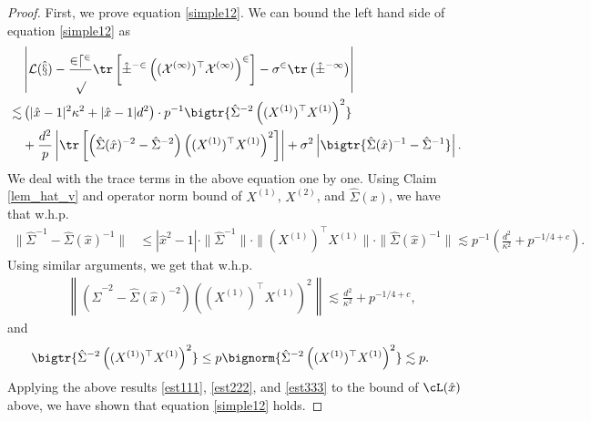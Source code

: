 \documentclass[aos,preprint]{imsart}
\begin{document}
\begin{proof}
First, we prove equation \eqref{simple12}.
We can bound the left hand side of equation \eqref{simple12} as
\begin{align*}
	&\left|\cal L(\hat x)-\frac{2d^2}{p}\tr\left[\hat\Sigma^{-2} \left((X^{(1)})^\top X^{(1)} \right)^2\right] -\sigma^2  \tr\left({\hat\Sigma^{-1}  }\right)\right| \\
	\lesssim &\left(|\hat x-1|^2 \kappa^2 + |\hat x-1|d^2\right)\cdot p^{-1}\bigtr{ \hat\Sigma^{-2} \left((X^{(1)})^{\top}X^{(1)}\right)^2 } \\
	&+ \frac{d^2}{p}\left|\tr\left[\left(\hat\Sigma(\hat x)^{-2}-\hat\Sigma^{-2}\right) \left((X^{(1)})^\top X^{(1)} \right)^2\right]\right|+ \sigma^2  \left|\bigtr{\hat\Sigma(\hat x)^{-1}-\hat\Sigma^{-1}  }\right|.
\end{align*}
We deal with the trace terms in the above equation one by one.
Using Claim \ref{lem_hat_v} and operator norm bound of $X^{(1)}$, $X^{(2)}$, and $\hat{\Sigma}(x)$, we have that w.h.p.
\begin{align}
	\|\hat\Sigma^{-1}-\hat\Sigma(\hat x)^{-1}\| &\le |\hat x^2-1| \cdot \|\hat\Sigma^{-1}\| \cdot \| (X^{(1)})^\top X^{(1)}\| \cdot \|\hat\Sigma(\hat x)^{-1}\|  \lesssim p^{-1}\left(\frac{d^2}{\kappa^2} + p^{-1/4+c}\right).\label{est111}
\end{align}
Using similar arguments, we get that w.h.p.
\begin{align}\label{est222}
&\left\|\left(\hat\Sigma^{-2}-\hat\Sigma(\hat x)^{-2}\right)\left((X^{(1)})^\top X^{(1)} \right)^2\right\| \lesssim  \frac{d^2}{\kappa^2} + p^{-1/4+c},
\end{align}
and
\begin{align}
& \bigtr{ \hat\Sigma^{-2} \left((X^{(1)})^{\top}X^{(1)}\right)^2}  \le p \bignorm{\hat\Sigma^{-2} \left((X^{(1)})^{\top}X^{(1)}\right)^2}\lesssim p.\label{est333}
\end{align}
Applying the above results \eqref{est111}, \eqref{est222}, and \eqref{est333} to the bound of $\cL(\hat{x})$ above, we have shown that equation \eqref{simple12} holds.


\end{proof}
\end{document}
